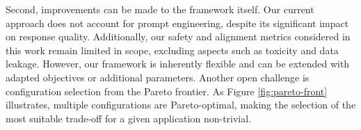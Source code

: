 Second, improvements can be made to the framework itself. Our current approach does not account for prompt engineering, despite its significant impact on response quality. Additionally, our safety and alignment metrics considered in this work remain limited in scope, excluding aspects such as toxicity and data leakage. However, our framework is inherently flexible and can be extended with adapted objectives or additional parameters. Another open challenge is configuration selection from the Pareto frontier. As Figure \ref{fig:pareto-front} illustrates, multiple configurations are Pareto-optimal, making the selection of the most suitable trade-off for a given application non-trivial.

